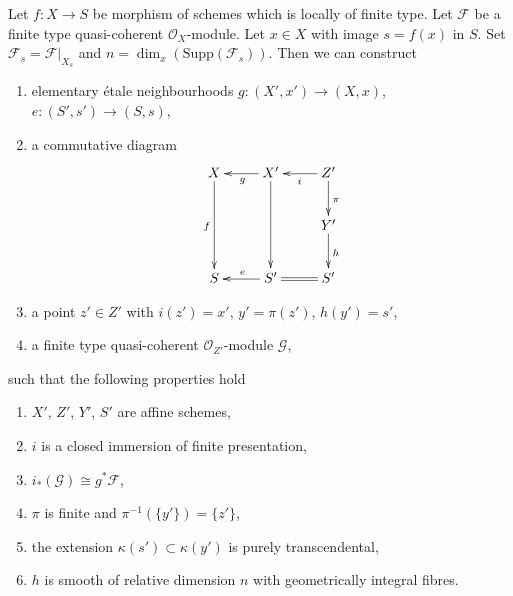 \begin{lemma}
\label{lemma-elementary-devissage}
Let $f : X \to S$ be morphism of schemes which is locally of finite type.
Let $\mathcal{F}$ be a finite type quasi-coherent $\mathcal{O}_X$-module.
Let $x \in X$ with image $s = f(x)$ in $S$.
Set $\mathcal{F}_s = \mathcal{F}|_{X_s}$ and
$n = \dim_x(\text{Supp}(\mathcal{F}_s))$.
Then we can construct
\begin{enumerate}
\item elementary \'etale neighbourhoods $g : (X', x') \to (X, x)$,
$e : (S', s') \to (S, s)$,
\item a commutative diagram
$$
\xymatrix{
X \ar[dd]_f & X' \ar[dd] \ar[l]^g & Z' \ar[l]^i \ar[d]^\pi \\
& & Y' \ar[d]^h \\
S & S' \ar[l]_e & S' \ar@{=}[l]
}
$$
\item a point $z' \in Z'$ with $i(z') = x'$, $y' = \pi(z')$, $h(y') = s'$,
\item a finite type quasi-coherent $\mathcal{O}_{Z'}$-module $\mathcal{G}$,
\end{enumerate}
such that the following properties hold
\begin{enumerate}
\item $X'$, $Z'$, $Y'$, $S'$ are affine schemes,
\item $i$ is a closed immersion of finite presentation,
\item $i_*(\mathcal{G}) \cong g^*\mathcal{F}$,
\item $\pi$ is finite and $\pi^{-1}(\{y'\}) = \{z'\}$,
\item the extension $\kappa(s') \subset \kappa(y')$ is purely transcendental,
\item $h$ is smooth of relative dimension $n$
with geometrically integral fibres.
\end{enumerate}
\end{lemma}


